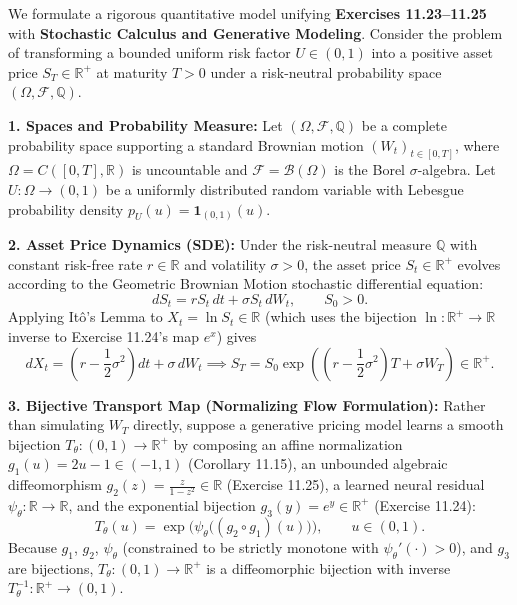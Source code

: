 \documentclass[11pt, letterpaper]{article}
\theoremstyle{definition}
\theoremstyle{remark}
\begin{document}
We formulate a rigorous quantitative model unifying \textbf{Exercises 11.23--11.25} with \textbf{Stochastic Calculus and Generative Modeling}. Consider the problem of transforming a bounded uniform risk factor $U \in (0, 1)$ into a positive asset price $S_T \in \mathbb{R}^+$ at maturity $T > 0$ under a risk-neutral probability space $(\Omega, \mathcal{F}, \mathbb{Q})$.

\textbf{1. Spaces and Probability Measure:}
Let $(\Omega, \mathcal{F}, \mathbb{Q})$ be a complete probability space supporting a standard Brownian motion $(W_t)_{t \in [0, T]}$, where $\Omega = C([0, T], \mathbb{R})$ is uncountable and $\mathcal{F} = \mathcal{B}(\Omega)$ is the Borel $\sigma$-algebra. Let $U : \Omega \to (0, 1)$ be a uniformly distributed random variable with Lebesgue probability density $p_U(u) = \mathbf{1}_{(0, 1)}(u)$.

\textbf{2. Asset Price Dynamics (SDE):}
Under the risk-neutral measure $\mathbb{Q}$ with constant risk-free rate $r \in \mathbb{R}$ and volatility $\sigma > 0$, the asset price $S_t \in \mathbb{R}^+$ evolves according to the Geometric Brownian Motion stochastic differential equation:
\[
dS_t = r S_t \, dt + \sigma S_t \, dW_t, \qquad S_0 > 0.
\]
Applying It\^o's Lemma to $X_t = \ln S_t \in \mathbb{R}$ (which uses the bijection $\ln : \mathbb{R}^+ \to \mathbb{R}$ inverse to Exercise 11.24's map $e^x$) gives
\[
dX_t = \left(r - \frac{1}{2}\sigma^2\right) dt + \sigma \, dW_t \implies S_T = S_0 \exp\!\left(\left(r - \frac{1}{2}\sigma^2\right)T + \sigma W_T\right) \in \mathbb{R}^+.
\]

\textbf{3. Bijective Transport Map (Normalizing Flow Formulation):}
Rather than simulating $W_T$ directly, suppose a generative pricing model learns a smooth bijection $T_\theta : (0, 1) \to \mathbb{R}^+$ by composing an affine normalization $g_1(u) = 2u - 1 \in (-1, 1)$ (Corollary 11.15), an unbounded algebraic diffeomorphism $g_2(z) = \frac{z}{1 - z^2} \in \mathbb{R}$ (Exercise 11.25), a learned neural residual $\psi_\theta : \mathbb{R} \to \mathbb{R}$, and the exponential bijection $g_3(y) = e^y \in \mathbb{R}^+$ (Exercise 11.24):
\[
T_\theta(u) = \exp\!\Big(\psi_\theta\big((g_2 \circ g_1)(u)\big)\Big), \qquad u \in (0, 1).
\]
Because $g_1$, $g_2$, $\psi_\theta$ (constrained to be strictly monotone with $\psi_\theta'(\cdot) > 0$), and $g_3$ are bijections, $T_\theta : (0, 1) \to \mathbb{R}^+$ is a diffeomorphic bijection with inverse $T_\theta^{-1} : \mathbb{R}^+ \to (0, 1)$.
\end{document}
